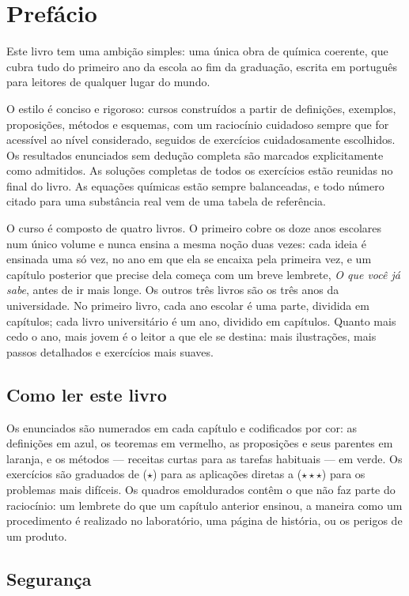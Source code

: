 \chapter{Prefácio}

Este livro tem uma ambição simples: uma única obra de química coerente,
que cubra tudo do primeiro ano da escola ao fim da graduação, escrita em
português para leitores de qualquer lugar do mundo.

O estilo é conciso e rigoroso: cursos construídos a partir de
definições, exemplos, proposições, métodos e esquemas, com um raciocínio
cuidadoso sempre que for acessível ao nível considerado, seguidos de
exercícios cuidadosamente escolhidos. Os resultados enunciados sem
dedução completa são marcados explicitamente como admitidos. As soluções
completas de todos os exercícios estão reunidas no final do livro. As
equações químicas estão sempre balanceadas, e todo número citado para
uma substância real vem de uma tabela de referência.

O curso é composto de quatro livros. O primeiro cobre os doze anos
escolares num único volume e nunca ensina a mesma noção duas vezes: cada
ideia é ensinada uma só vez, no ano em que ela se encaixa pela primeira
vez, e um capítulo posterior que precise dela começa com um breve
lembrete, \emph{O que você já sabe}, antes de ir mais longe. Os outros
três livros são os três anos da universidade. No primeiro livro, cada
ano escolar é uma parte, dividida em capítulos; cada livro universitário
é um ano, dividido em capítulos. Quanto mais cedo o ano, mais jovem é o
leitor a que ele se destina: mais ilustrações, mais passos detalhados e
exercícios mais suaves.

\section*{Como ler este livro}

Os enunciados são numerados em cada capítulo e codificados por cor: as
definições em azul, os teoremas em vermelho, as proposições e seus
parentes em laranja, e os métodos --- receitas curtas para as tarefas
habituais --- em verde. Os exercícios são graduados de ($\star$) para as
aplicações diretas a ($\star\star\star$) para os problemas mais
difíceis. Os quadros emoldurados contêm o que não faz parte do
raciocínio: um lembrete do que um capítulo anterior ensinou, a maneira
como um procedimento é realizado no laboratório, uma página de história,
ou os perigos de um produto.

\section*{Segurança}

